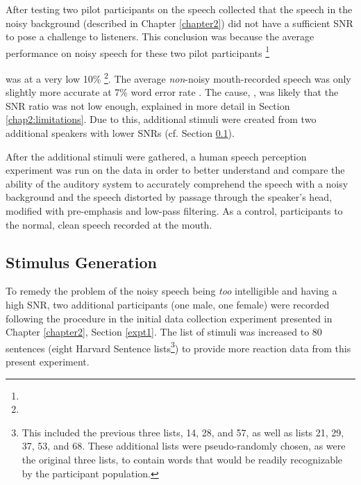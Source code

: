 After testing two pilot participants on the speech collected \DIFdelbegin {}\DIFdelend \DIFaddbegin {}\DIFaddend that the speech in the noisy background (described in Chapter \ref{chapter2}) did not have a sufficient SNR to pose a challenge to listeners.  This conclusion was \DIFdelbegin {}\DIFdelend \DIFaddbegin {}\DIFaddend because the average performance on \DIFaddbegin {}\DIFaddend noisy speech for these two pilot participants \DIFdelbegin {}\footnote{}%
\addtocounter{footnote}{-1}%
\DIFdel{) }\DIFdelend was at a very low 10\% \DIFdelbegin {}\DIFdelend \DIFaddbegin {}\footnote{}\DIFaddend .  The average \textit{non}-noisy mouth-recorded speech was only slightly more accurate at 7\% word error rate \DIFaddbegin {}\DIFaddend . The cause, \DIFdelbegin {}\DIFdelend \DIFaddbegin {}\DIFaddend , was likely that the SNR ratio was not low enough, explained in more detail in Section \ref{chap2:limitations}.  Due to this, additional stimuli were created from two additional speakers with lower SNRs (cf. Section \ref{chap3:methods:stimuli}).

After the additional stimuli were gathered, a human speech perception experiment was run on the data in order to better understand and compare the ability of the \DIFaddbegin {}\DIFaddend auditory system to accurately comprehend the speech with a noisy background and the speech distorted by passage through the speaker's head, modified with pre-emphasis and low-pass filtering.  As a control, participants \DIFdelbegin {}\DIFdelend \DIFaddbegin {}\DIFaddend to the normal, clean speech recorded at the mouth.

\subsection{Stimulus Generation}
\label{chap3:methods:stimuli}

To remedy the problem of the noisy speech being \textit{too} intelligible and having a high SNR, 
two additional participants (one male, one female) were recorded following the procedure in the initial data collection experiment presented in Chapter \ref{chapter2}, Section \ref{expt1}.  The list of stimuli was increased to 80 sentences (eight Harvard Sentence lists\footnote{This included the previous three lists, 14, 28, and 57, as well as lists 21, 29, 37, 53, and 68. These additional lists were pseudo-randomly chosen, as were the original three lists, to contain words that would be readily recognizable by the participant population.}) to provide more reaction data from this present experiment.  

